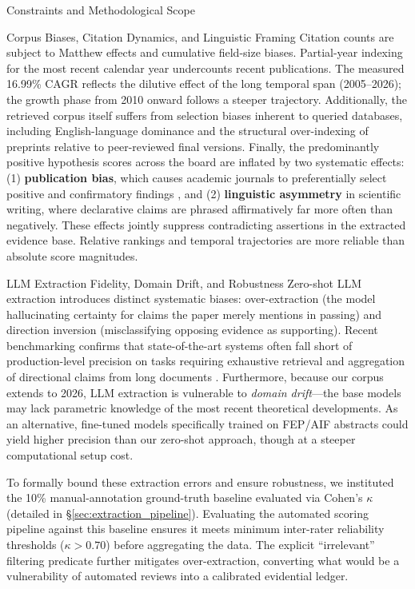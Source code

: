 \documentclass[
  ignorenonframetext,
]{beamer}
\begin{document}
\begin{frame}{Constraints and Methodological Scope}
\begin{block}{Corpus Biases, Citation Dynamics, and Linguistic Framing}
\protect{}\label{corpus-biases-citation-dynamics-and-linguistic-framing}
Citation counts are subject to Matthew effects and cumulative field-size
biases. Partial-year indexing for the most recent calendar year
undercounts recent publications. The measured 16.99\% CAGR reflects the
dilutive effect of the long temporal span (2005--2026); the growth phase
from 2010 onward follows a steeper trajectory. Additionally, the
retrieved corpus itself suffers from selection biases inherent to
queried databases, including English-language dominance and the
structural over-indexing of preprints relative to peer-reviewed final
versions. Finally, the predominantly positive hypothesis scores across
the board are inflated by two systematic effects: (1)
\textbf{publication bias}, which causes academic journals to
preferentially select positive and confirmatory findings
\citep{sterling1959publication}, and (2) \textbf{linguistic asymmetry}
in scientific writing, where declarative claims are phrased
affirmatively far more often than negatively. These effects jointly
suppress contradicting assertions in the extracted evidence base.
Relative rankings and temporal trajectories are more reliable than
absolute score magnitudes.
\end{block}

\begin{block}{LLM Extraction Fidelity, Domain Drift, and Robustness}
\protect{}\label{llm-extraction-fidelity-domain-drift-and-robustness}
Zero-shot LLM extraction introduces distinct systematic biases:
over-extraction (the model hallucinating certainty for claims the paper
merely mentions in passing) and direction inversion (misclassifying
opposing evidence as supporting). Recent benchmarking confirms that
state-of-the-art systems often fall short of production-level precision
on tasks requiring exhaustive retrieval and aggregation of directional
claims from long documents \citep{liang2024survey}. Furthermore, because
our corpus extends to 2026, LLM extraction is vulnerable to \emph{domain
drift}---the base models may lack parametric knowledge of the most
recent theoretical developments. As an alternative, fine-tuned models
specifically trained on FEP/AIF abstracts could yield higher precision
than our zero-shot approach, though at a steeper computational setup
cost.

To formally bound these extraction errors and ensure robustness, we
instituted the 10\% manual-annotation ground-truth baseline evaluated
via Cohen's \(\kappa\) (detailed in \S\ref{sec:extraction_pipeline}).
Evaluating the automated scoring pipeline against this baseline ensures
it meets minimum inter-rater reliability thresholds (\(\kappa > 0.70\))
before aggregating the data. The explicit ``irrelevant'' filtering
predicate further mitigates over-extraction, converting what would be a
vulnerability of automated reviews into a calibrated evidential ledger.
\end{block}
\end{frame}
\end{document}
